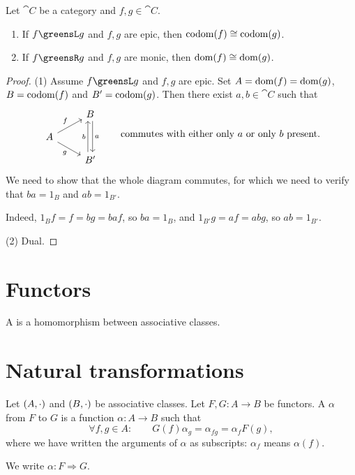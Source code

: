 \begin{lemma} \label{leftRightRelatedIsomorphic}
Let $\cat{C}$ be a category and $f,g\in \cat{C}$.
\begin{enumerate}
\item If $f \greensL g$ and $f,g$ are epic, then $\operatorname{codom}(f) \cong \operatorname{codom}(g)$.
\item If $f \greensR g$ and $f,g$ are monic, then $\operatorname{dom}(f) \cong \operatorname{dom}(g)$.
\end{enumerate}
\end{lemma}
\begin{proof}
(1) Assume $f \greensL g$ and $f,g$ are epic. Set $A = \operatorname{dom}(f) = \operatorname{dom}(g)$, $B=\operatorname{codom}(f)$ and $B'=\operatorname{codom}(g)$. Then there exist $a,b\in \cat{C}$ such that
\[ \begin{tikzcd}[row sep=small]
{} & B \arrow[dd, shift left, "a"] \\
A \arrow[ur, "f"] \arrow[dr, swap, "g"] & {} \\
{} & B' \arrow[uu, shift left, "b"]
\end{tikzcd} \qquad \text{commutes with either only $a$ or only $b$ present.} \]
We need to show that the whole diagram commutes, for which we need to verify that $ba = 1_B$ and $ab = 1_{B'}$.

Indeed, $1_{B}f = f = bg = baf$, so $ba = 1_B$, and $1_{B'}g = af = abg$, so $ab = 1_{B'}$.

(2) Dual.
\end{proof}

\section{Functors}
\begin{definition}
A  is a homomorphism between associative classes.
\end{definition}

\section{Natural transformations}
\begin{definition}
Let $\left( A,\cdot \right)$ and $\left( B,\cdot \right)$ be associative classes. Let $F,G: A\to B$ be functors. A  $\alpha$ from $F$ to $G$ is a function $\alpha: A\to B$ such that
\[ \forall f,g\in A: \qquad G(f)\alpha_g = \alpha_{fg} = \alpha_f F(g), \]
where we have written the arguments of $\alpha$ as subscripts: $\alpha_f$ means $\alpha(f)$.

We write $\alpha: F \Rightarrow G$.
\end{definition}

